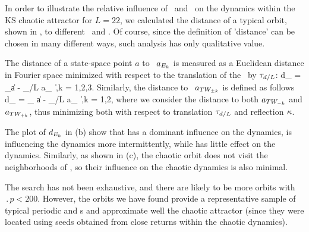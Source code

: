 In order to illustrate the relative influence of \eqva\ and \reqva\ on the dynamics
within the KS chaotic attractor for $L = 22$, we calculated the distance of a
typical orbit, shown in , to different \eqva\ and \reqva .
Of course, since the definition of 'distance' can be chosen in many different ways, such
analysis has only qualitative value.

The distance of a state-space point $a$ to \eqv\ $a_{E_{k}}$ is measured as a
Euclidean distance in Fourier space minimized with respect to the translation
of the \eqv\ by $\tau_{d/L}$:
\beq
  d_{} = \min_\shift \|a - \Shift_{\shift/L} a_{} \|\,,\quad k = 1,2,3.
Similarly, the distance to \reqv\ $a_{TW_{\pm k}}$ is defined as follows
\beq
  d_{} = \min_{\shift} \|a - \Shift_{\shift/L} a_{} \|\,,\quad k = 1,2,
where we consider the distance to both $a_{TW_{-k}}$ and $a_{TW_{+k}}$, thus
minimizing both with respect to translation $\tau_{d/L}$ and reflection $\kappa$.

The plot of $d_{E_{k}}$ in (b) show that  has a dominant
influence on the dynamics,  is influencing the dynamics more intermittently, while
 has little effect on the dynamics.  Similarly, as shown in (c),
the chaotic orbit does not visit the neighborhoods of \reqva , so their influence on
the chaotic dynamics is also minimal.

The search has not been exhaustive, and there are likely to
be more orbits with $\period{p} < 200$. However, the orbits
we have found provide a representative sample of typical
periodic and \rpo s and approximate well the chaotic
attractor (since they were located using seeds obtained from
close returns within the chaotic dynamics).

